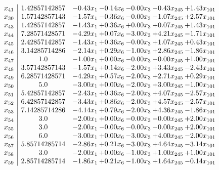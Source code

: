 \documentclass[8pt]{article}
\begin{document}
\[\begin{array}{c| c c@{\hskip 2pt} c@{\hskip 2pt} c@{\hskip 2pt} c@{\hskip 2pt} c@{\hskip 2pt} }
 x_{41}   &  1.42857142857 & -0.43 x_{1} & -0.14 x_{6} & -0.00 x_{3} & -0.43 x_{245} & +  1.43 x_{101}\\
 x_{30}   &  1.57142857143 & -1.57 x_{1} & -0.36 x_{6} & -0.00 x_{3} & -1.07 x_{245} & +  2.57 x_{101}\\
 x_{43}   &  1.42857142857 & -1.43 x_{1} & +  0.36 x_{6} & +  0.00 x_{3} & +  0.07 x_{245} & +  1.43 x_{101}\\
 x_{44}   &  7.28571428571 & -4.29 x_{1} & +  0.07 x_{6} & -3.00 x_{3} & +  4.21 x_{245} & -1.71 x_{101}\\
 x_{45}   &  2.42857142857 & -1.43 x_{1} & +  0.36 x_{6} & -0.00 x_{3} & +  1.07 x_{245} & +  0.43 x_{101}\\
 x_{46}   &  3.14285714286 & -2.14 x_{1} & +  0.29 x_{6} & -1.00 x_{3} & +  2.86 x_{245} & -1.86 x_{101}\\
 x_{47}   &  1.0 & -1.00 x_{1} & +  0.00 x_{6} & -0.00 x_{3} & -0.00 x_{245} & +  1.00 x_{101}\\
 x_{48}   &  3.57142857143 & -1.57 x_{1} & +  0.14 x_{6} & -2.00 x_{3} & +  3.43 x_{245} & -2.43 x_{101}\\
 x_{49}   &  6.28571428571 & -4.29 x_{1} & +  0.57 x_{6} & -2.00 x_{3} & +  2.71 x_{245} & +  0.29 x_{101}\\
 x_{50}   &  5.0 & -3.00 x_{1} & +  0.00 x_{6} & -2.00 x_{3} & +  3.00 x_{245} & -1.00 x_{101}\\
 x_{51}   &  5.42857142857 & -2.43 x_{1} & +  0.36 x_{6} & -2.00 x_{3} & +  4.07 x_{245} & -2.57 x_{101}\\
 x_{52}   &  6.42857142857 & -3.43 x_{1} & +  0.86 x_{6} & -2.00 x_{3} & +  4.57 x_{245} & -2.57 x_{101}\\
 x_{53}   &  7.14285714286 & -4.14 x_{1} & +  0.79 x_{6} & -2.00 x_{3} & +  4.36 x_{245} & -1.86 x_{101}\\
 x_{54}   &  3.0 & -2.00 x_{1} & +  0.00 x_{6} & -0.00 x_{3} & -0.00 x_{245} & +  2.00 x_{101}\\
 x_{55}   &  3.0 & -2.00 x_{1} & -0.00 x_{6} & -0.00 x_{3} & -0.00 x_{245} & +  2.00 x_{101}\\
 x_{56}   &  6.0 & -3.00 x_{1} & +  0.00 x_{6} & -3.00 x_{3} & +  4.00 x_{245} & -2.00 x_{101}\\
 x_{57}   &  5.85714285714 & -2.86 x_{1} & +  0.21 x_{6} & -3.00 x_{3} & +  4.64 x_{245} & -3.14 x_{101}\\
 x_{58}   &  3.0 & -2.00 x_{1} & +  0.00 x_{6} & -1.00 x_{3} & +  1.00 x_{245} & +  1.00 x_{101}\\
 x_{59}   &  2.85714285714 & -1.86 x_{1} & +  0.21 x_{6} & -1.00 x_{3} & +  1.64 x_{245} & -0.14 x_{101}\\

\end{array}\]
\end{document}
